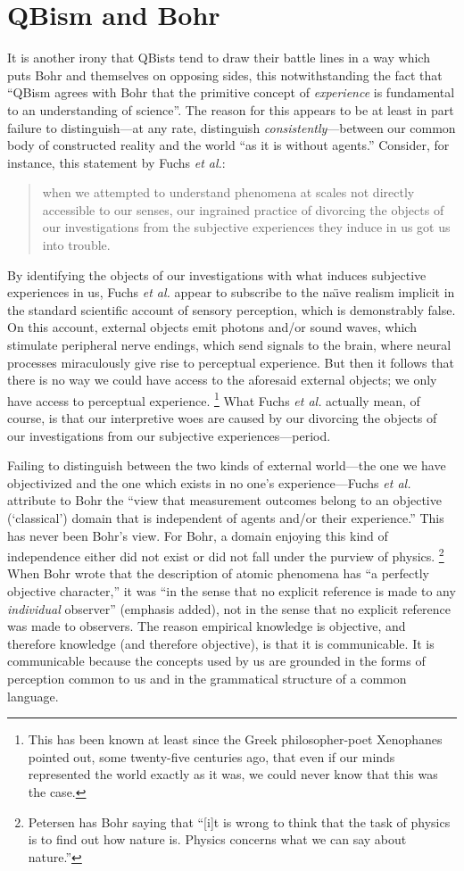 \documentclass[smallextended]{svjour3}
\newcommand{\bq}{\begin{quote}}
\newcommand{\eq}{\end{quote}}
\begin{document}
\section{QBism and Bohr}\label{sec_QBB}
It is another irony that QBists tend to draw their battle lines in a way which puts Bohr and themselves on opposing sides, this notwithstanding the fact that ``QBism agrees with Bohr that the primitive concept of \emph{experience} is fundamental to an understanding of science''.\cite{FMS2014} The reason for this appears to be at least in part failure to distinguish---at any rate, distinguish \emph{consistently}---between our common body of constructed reality and the world ``as it is without agents.'' Consider, for instance, this statement by Fuchs \emph{et al.}\cite{FMS2014}:
\bq 
when we attempted to understand phenomena at scales not directly accessible to our senses, our ingrained practice of divorcing the objects of our investigations from the subjective experiences they induce in us got us into trouble.
\eq
By identifying the objects of our investigations with what induces subjective experiences in us, Fuchs \emph{et al.} appear to subscribe to the na\"\i ve realism implicit in the standard scientific account of sensory perception, which is demonstrably false. On this account, external objects emit photons and/or sound waves, which stimulate peripheral nerve endings, which send signals to the brain, where neural processes miraculously give rise to perceptual experience. But then it follows that there is no way we could have access to the aforesaid external objects; we only have access to perceptual experience.%
\footnote{This has been known at least since the Greek philosopher-poet {Xenophanes} pointed out, some twenty-five centuries ago, that even if our minds represented the world exactly as it was, we could never know that this was the case.}
What Fuchs \emph{et al.} actually mean, of course, is that our interpretive woes are caused by our divorcing the objects of our investigations from our subjective experiences---period.

Failing to distinguish between the two kinds of external world---the one we have objectivized and the one which exists in no one's experience---Fuchs \emph{et al.} attribute to Bohr the ``view that measurement outcomes belong to an objective (`classical') domain that is independent of agents and/or their experience.'' This has never been Bohr's view. For Bohr, a domain enjoying this kind of independence either did not exist or did not fall under the purview of physics.%
\footnote{Petersen\cite{Petersen1963} has Bohr saying that ``[i]t is wrong to think that the task of physics is to find out how nature is. Physics concerns what we can say about nature.''}
When Bohr wrote that the description of atomic phenomena has ``a perfectly objective character,'' it was ``in the sense that no explicit reference is made to any \emph{individual} observer'' (emphasis added),\cite{BohrE58-62} not in the sense that no explicit reference was made to observers. The reason empirical knowledge is objective, and therefore knowledge (and therefore objective), is that it is communicable. It is communicable because the concepts used by us are grounded in the forms of perception common to us and in the grammatical structure of a common language.
\end{document}
